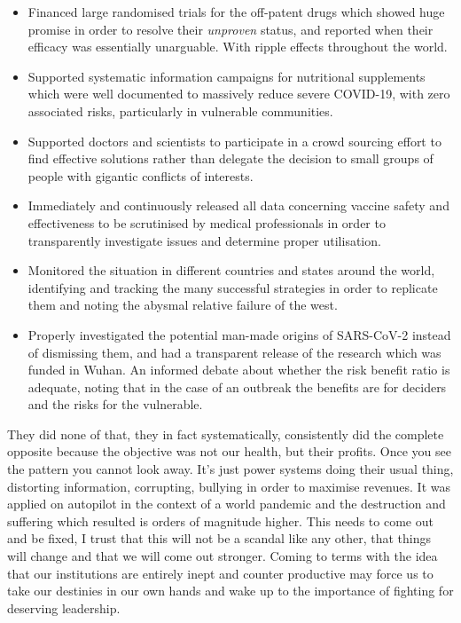 \documentclass[11pt,a4paper]{article}
\begin{document}
\begin{itemize}
  \item Financed large randomised trials for the off-patent drugs which showed huge promise in order to resolve their \textit{unproven} status, and reported when their efficacy was essentially unarguable. With ripple effects throughout the world.
  \item Supported systematic information campaigns for nutritional supplements which were well documented to massively reduce severe COVID-19, with zero associated risks, particularly in vulnerable communities.
  \item Supported doctors and scientists to participate in a crowd sourcing effort to find effective solutions rather than delegate the decision to small groups of people with gigantic conflicts of interests.
  \item Immediately and continuously released all data concerning vaccine safety and effectiveness to be scrutinised by medical professionals in order to transparently investigate issues and determine proper utilisation.
  \item Monitored the situation in different countries and states around the world, identifying and tracking the many successful strategies in order to replicate them and noting the abysmal relative failure of the west.
  \item Properly investigated the potential man-made origins of SARS-CoV-2 instead of dismissing them, and had a transparent release of the research which was funded in Wuhan. An informed debate about whether the risk benefit ratio is adequate, noting that in the case of an outbreak the benefits are for deciders and the risks for the vulnerable.
\end{itemize}

They did none of that, they in fact systematically, consistently did the complete opposite because the objective was not our health, but their profits. Once you see the pattern you cannot look away. It's just power systems doing their usual thing, distorting information, corrupting, bullying in order to maximise revenues. It was applied on autopilot in the context of a world pandemic and the destruction and suffering which resulted is orders of magnitude higher. This needs to come out and be fixed, I trust that this will not be a scandal like any other, that things will change and that we will come out stronger. Coming to terms with the idea that our institutions are entirely inept and counter productive may force us to take our destinies in our own hands and wake up to the importance of fighting for deserving leadership.
\end{document}
